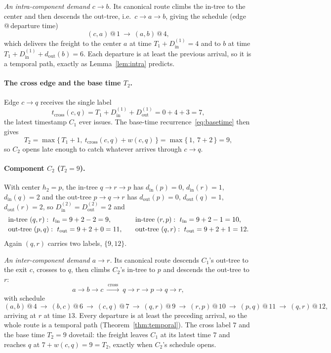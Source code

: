 \documentclass[11pt]{article}
\theoremstyle{definition}
\theoremstyle{remark}
\newcommand{\din}{d_{\mathrm{in}}}
\newcommand{\dout}{d_{\mathrm{out}}}
\begin{document}
\emph{An intra-component demand $c\to b$.} Its canonical route climbs the in-tree to the center and
then descends the out-tree, i.e.\ $c\to a\to b$, giving the schedule (edge\,@\,departure time)
\[
  (c,a)\,@\,1\ \longrightarrow\ (a,b)\,@\,4,
\]
which delivers the freight to the center $a$ at time $T_1+D^{(1)}_{\mathrm{in}}=4$ and to $b$ at time
$T_1+D^{(1)}_{\mathrm{in}}+\dout(b)=6$. Each departure is at least the previous arrival, so it is a
temporal path, exactly as Lemma~\ref{lem:intra} predicts.

\paragraph{The cross edge and the base time $T_2$.} Edge $c\to q$ receives the single label
\[
  t_{\mathrm{cross}}(c,q)=T_1+D^{(1)}_{\mathrm{in}}+D^{(1)}_{\mathrm{out}}=0+4+3=7,
\]
the latest timestamp $C_1$ ever issues. The base-time recurrence~\eqref{eq:basetime} then gives
\[
  T_2=\max\{\,T_1+1,\ t_{\mathrm{cross}}(c,q)+w(c,q)\,\}=\max\{\,1,\ 7+2\,\}=9,
\]
so $C_2$ opens late enough to catch whatever arrives through $c\to q$.

\paragraph{Component $C_2$ ($T_2=9$).} With center $h_2=p$, the in-tree $q\to r\to p$ has
$\din(p)=0$, $\din(r)=1$, $\din(q)=2$ and the out-tree $p\to q\to r$ has $\dout(p)=0$, $\dout(q)=1$,
$\dout(r)=2$, so $D^{(2)}_{\mathrm{in}}=D^{(2)}_{\mathrm{out}}=2$ and
\[
  \begin{array}{l@{\qquad}l}
    \text{in-tree }(q,r):\ t_{\mathrm{in}}=9+2-2=9,   & \text{in-tree }(r,p):\ t_{\mathrm{in}}=9+2-1=10,\\[2pt]
    \text{out-tree }(p,q):\ t_{\mathrm{out}}=9+2+0=11, & \text{out-tree }(q,r):\ t_{\mathrm{out}}=9+2+1=12.
  \end{array}
\]
Again $(q,r)$ carries two labels, $\{9,12\}$.

\emph{An inter-component demand $a\to r$.} Its canonical route descends $C_1$'s out-tree to the exit
$c$, crosses to $q$, then climbs $C_2$'s in-tree to $p$ and descends the out-tree to $r$:
\[
  a\to b\to c\ \xrightarrow{\ \mathrm{cross}\ }\ q\to r\to p\to q\to r,
\]
with schedule
\[
  (a,b)\,@\,4\ \to\ (b,c)\,@\,6\ \to\ (c,q)\,@\,7\ \to\ (q,r)\,@\,9\ \to\ (r,p)\,@\,10\ \to\ (p,q)\,@\,11\ \to\ (q,r)\,@\,12,
\]
arriving at $r$ at time $13$. Every departure is at least the preceding arrival, so the whole route is
a temporal path (Theorem~\ref{thm:temporal}). The cross label $7$ and the base time $T_2=9$ dovetail:
the freight leaves $C_1$ at its latest time $7$ and reaches $q$ at $7+w(c,q)=9=T_2$, exactly when
$C_2$'s schedule opens.
\end{document}

